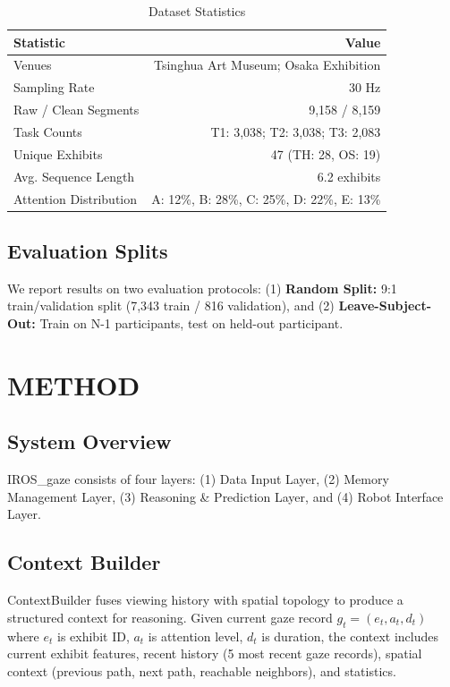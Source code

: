 \documentclass{article}
\begin{document}
\begin{table}[h]
\centering
\caption{Dataset Statistics}
\begin{tabular}{lr}
\toprule
Statistic & Value \\
\midrule
Venues & Tsinghua Art Museum; Osaka Exhibition \\
Sampling Rate & 30 Hz \\
Raw / Clean Segments & 9,158 / 8,159 \\
Task Counts & T1: 3,038; T2: 3,038; T3: 2,083 \\
Unique Exhibits & 47 (TH: 28, OS: 19) \\
Avg. Sequence Length & 6.2 exhibits \\
Attention Distribution & A: 12\%, B: 28\%, C: 25\%, D: 22\%, E: 13\% \\
\bottomrule
\end{tabular}
\end{table}

\subsection{Evaluation Splits}

We report results on two evaluation protocols: (1) \textbf{Random Split:} 9:1 train/validation split (7,343 train / 816 validation), and (2) \textbf{Leave-Subject-Out:} Train on N-1 participants, test on held-out participant.

\section{METHOD}

\subsection{System Overview}

IROS\_gaze consists of four layers: (1) Data Input Layer, (2) Memory Management Layer, (3) Reasoning \& Prediction Layer, and (4) Robot Interface Layer.

\subsection{Context Builder}

ContextBuilder fuses viewing history with spatial topology to produce a structured context for reasoning. Given current gaze record $g_t = (e_t, a_t, d_t)$ where $e_t$ is exhibit ID, $a_t$ is attention level, $d_t$ is duration, the context includes current exhibit features, recent history (5 most recent gaze records), spatial context (previous path, next path, reachable neighbors), and statistics.
\end{document}

